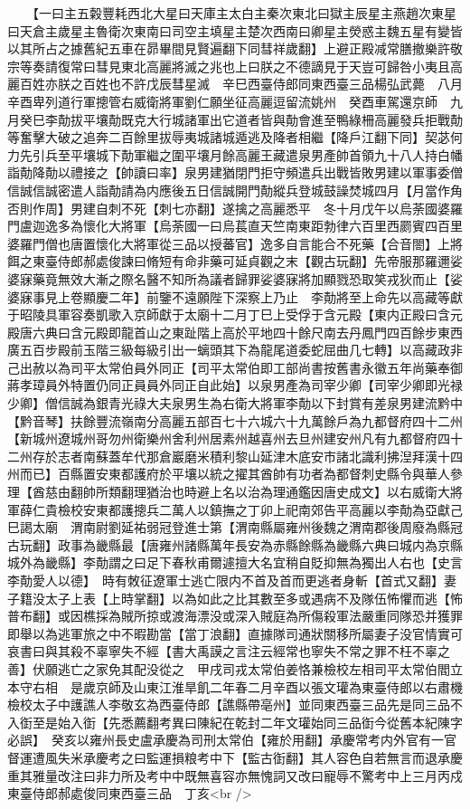 　　【一曰主五糓豐耗西北大星曰天庫主太白主秦次東北曰獄主辰星主燕趙次東星曰天倉主歲星主魯衛次東南曰司空主填星主楚次西南曰卿星主熒惑主魏五星有變皆以其所占之據舊紀五車在昴畢間見賢遍翻下同彗祥歲翻】上避正殿减常膳撤樂許敬宗等奏請復常曰彗見東北高麗將滅之兆也上曰朕之不德謫見于天豈可歸咎小夷且高麗百姓亦朕之百姓也不許戊辰彗星滅　辛巳西臺侍郎同東西臺三品楊弘武薨　八月辛酉卑列道行軍摠管右威衛將軍劉仁願坐征高麗逗留流姚州　癸酉車駕還京師　九月癸巳李勣拔平壤勣既克大行城諸軍出它道者皆與勣會進至鴨綠柵高麗發兵拒戰勣等奮擊大破之追奔二百餘里拔辱夷城諸城遁逃及降者相繼【降戶江翻下同】契苾何力先引兵至平壤城下勣軍繼之圍平壤月餘高麗王藏遣泉男產帥首領九十八人持白幡詣勣降勣以禮接之【帥讀曰率】泉男建猶閉門拒守頻遣兵出戰皆敗男建以軍事委僧信誠信誠密遣人詣勣請為内應後五日信誠開門勣縱兵登城鼓譟焚城四月【月當作角否則作周】男建自刺不死【刺七亦翻】遂擒之高麗悉平　冬十月戊午以烏荼國婆羅門盧迦逸多為懷化大將軍【烏荼國一曰烏萇直天竺南東距勃律六百里西罽賓四百里婆羅門僧也唐置懷化大將軍從三品以授蕃官】逸多自言能合不死藥【合音閤】上將餌之東臺侍郎郝處俊諫曰脩短有命非藥可延貞觀之末【觀古玩翻】先帝服那羅邇娑婆寐藥竟無效大漸之際名醫不知所為議者歸罪娑婆寐將加顯戮恐取笑戎狄而止【娑婆寐事見上卷顯慶二年】前鑒不遠願陛下深察上乃止　李勣將至上命先以高藏等獻于昭陵具軍容奏凱歌入京師獻于太廟十二月丁巳上受俘于含元殿【東内正殿曰含元殿唐六典曰含元殿即龍首山之東趾階上高於平地四十餘尺南去丹鳳門四百餘步東西廣五百步殿前玉階三級每級引出一螭頭其下為龍尾道委蛇屈曲几七轉】以高藏政非己出赦以為司平太常伯員外同正【司平太常伯即工部尚書按舊書永徽五年尚藥奉御蔣孝璋員外特置仍同正員員外同正自此始】以泉男產為司宰少卿【司宰少卿即光禄少卿】僧信誠為銀青光祿大夫泉男生為右衛大將軍李勣以下封賞有差泉男建流黔中【黔音琴】扶餘豐流嶺南分高麗五部百七十六城六十九萬餘戶為九都督府四十二州【新城州遼城州哥勿州衛樂州舍利州居素州越喜州去旦州建安州凡有九都督府四十二州存於志者南蘇蓋牟代那倉巖磨米積利黎山延津木底安市諸北識利拂湼拜漢十四州而已】百縣置安東都護府於平壤以統之擢其酋帥有功者為都督刺史縣令與華人參理【酋慈由翻帥所類翻理猶治也時避上名以治為理通鑑因唐史成文】以右威衛大將軍薛仁貴檢校安東都護摠兵二萬人以鎮撫之丁卯上祀南郊告平高麗以李勣為亞獻己巳謁太廟　渭南尉劉延祐弱冠登進士第【渭南縣屬雍州後魏之渭南郡後周廢為縣冠古玩翻】政事為畿縣最【唐雍州諸縣萬年長安為赤縣餘縣為畿縣六典曰城内為京縣城外為畿縣】李勣謂之曰足下春秋甫爾遽擅大名宜稍自貶抑無為獨出人右也【史言李勣愛人以德】　時有敇征遼軍士逃亡限内不首及首而更逃者身斬【首式又翻】妻子籍没太子上表【上時掌翻】以為如此之比其數至多或遇病不及隊伍怖懼而逃【怖普布翻】或因樵採為賊所掠或渡海漂没或深入賊庭為所傷殺軍法嚴重同隊恐并獲罪即舉以為逃軍旅之中不暇勘當【當丁浪翻】直據隊司通狀關移所屬妻子没官情實可哀書曰與其殺不辜寧失不經【書大禹謨之言注云經常也寧失不常之罪不枉不辜之善】伏願逃亡之家免其配没從之　甲戌司戎太常伯姜恪兼檢校左相司平太常伯閻立本守右相　是歲京師及山東江淮旱飢二年春二月辛酉以張文瓘為東臺侍郎以右肅機檢校太子中護譙人李敬玄為西臺侍郎【譙縣帶亳州】並同東西臺三品先是同三品不入衘至是始入衘【先悉薦翻考異曰陳紀在乾封二年文瓘始同三品衘今從舊本紀陳字必誤】　癸亥以雍州長史盧承慶為司刑太常伯【雍於用翻】承慶常考内外官有一官督運遭風失米承慶考之曰監運損粮考中下【監古衘翻】其人容色自若無言而退承慶重其雅量改注曰非力所及考中中既無喜容亦無愧詞又改曰寵辱不驚考中上三月丙戍東臺侍郎郝處俊同東西臺三品　丁亥<br />
